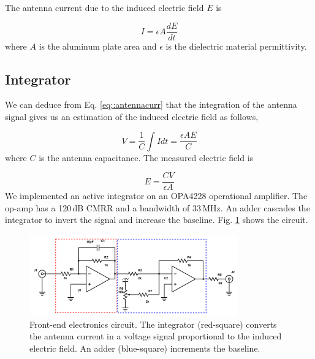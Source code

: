 \documentclass[letterpaper,12pt]{article}
\begin{document}
The antenna current due to the induced electric field $E$ is

\begin{equation}\label{equ_inte}
I=\epsilon A \dfrac{dE}{dt}
\label{eq::antennacurr}
\end{equation}
\noindent where $A$ is the aluminum plate area and $\epsilon$ is the dielectric material permittivity. 

\subsection{Integrator}

We can deduce from Eq. \ref{eq::antennacurr} that the integration of the antenna signal gives us an estimation of the induced electric field as follows,

\begin{equation}\label{equ_inte}
V = \frac{1}{C} \int I dt = \frac{\epsilon A E}{C}
\label{eq::antennavol}
\end{equation}
\noindent where $C$ is the antenna capacitance. The measured electric field is

\begin{equation}\label{equ_inte}
E = \frac{CV}{\epsilon A}
\label{eq::antennaE}
\end{equation}
We implemented an active integrator on an OPA4228 operational amplifier. The op-amp has a 120\,dB CMRR and a bandwidth of 33\,MHz. An adder cascades the integrator to invert the signal and increase the baseline. Fig. \ref{fig::integrator} shows the circuit.

\begin{figure}[h!]
\begin{center}
\includegraphics[width=0.8\textwidth]{Figures/Integrador_circuito.png}
\caption{Front-end electronics circuit. The integrator (red-square) converts the antenna current in a voltage signal proportional to the induced electric field. An adder (blue-square) increments the baseline.}
\label{fig::integrator}
\end{center}
\end{figure}
\end{document}
